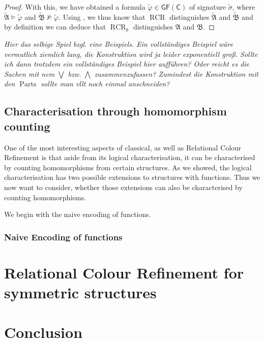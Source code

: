 \documentclass[a4paper,11pt,DIV=15]{scrartcl} %
\renewcommand{\phi}{\varphi}
\theoremstyle{plain}
\theoremstyle{definition}
\newcommand{\GFC}{\mathsf{GF}(\mathsf{C})}
\newcommand{\RCR}{\operatorname{RCR}}
\begin{document}
\begin{proof}
	With this, we have obtained a formula $\widetilde{\phi}\in\GFC$ of signature $\widetilde{\sigma}$, where $\widetilde{\mathfrak A}\models \widetilde{\phi}$ and $\widetilde{\mathfrak B}\not\models \widetilde{\phi}$.
	Using \cite{scheidt2025ColorRefinement}, we thus know that $\RCR$ distinguishes $\widetilde{\mathfrak A}$ and $\widetilde{\mathfrak B}$ and by definition we can deduce that $\RCR_k$ distinguishes $\mathfrak A$ and $\mathfrak B$.
\end{proof}

\emph{Hier das selbige Spiel bzgl. eine Beispiels. Ein vollständiges Beispiel wäre vermutlich ziemlich lang, die Konstruktion wird ja leider exponentiell groß. Sollte ich dann trotzdem ein vollständiges Beispiel hier aufführen? Oder reicht es die Sachen mit nem $\bigvee$ bzw. $\bigwedge$ zusammenzufassen? Zumindest die Konstruktion mit den $\operatorname{Parts}$ sollte man vllt noch einmal anschneiden?}


\subsection{Characterisation through homomorphism counting}

One of the most interesting aspects of classical, as well as Relational Colour Refinement is that aside from its logical characterisation, it can be characterised by counting homomorphisms from certain structures.
As we showed, the logical characterisation has two possible extensions to structures with functions.
Thus we now want to consider, whether those extensions can also be characterised by counting homomorphisms.

We begin with the naive encoding of functions.

\subsubsection{Naive Encoding of functions}




\section {Relational Colour Refinement for symmetric structures}


\section{Conclusion}



\clearpage



\end{document}
